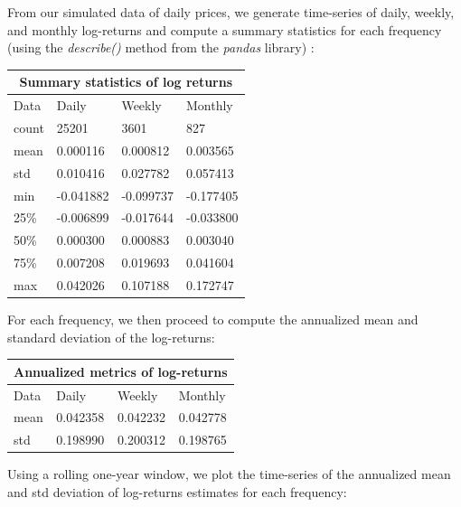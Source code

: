 \documentclass[10pt]{article}
\newenvironment{exercise}[2][Exercise]{\begin{trivlist}
  \item[\hskip \labelsep {\bfseries #1}\hskip \labelsep {\bfseries #2.}]}{\end{trivlist}}
\begin{document}
  \begin{exercise}{3}
 	 
	From our simulated data of daily prices, we generate time-series of daily, weekly, and monthly log-returns and compute a summary statistics for each frequency (using the \textit{describe()} method from the \textit{pandas} library) :
	
	\bigbreak
	
	\begin{tabular}{ |p{3cm}||p{3cm}|p{3cm}|p{3cm}|  }
 		\hline
		\multicolumn{4}{|c|}{Summary statistics of log returns} \\
		\hline
		Data & Daily & Weekly & Monthly\\
 		\hline
 		count   &  25201 & 3601 & 827\\
 		mean & 0.000116 & 0.000812 & 0.003565\\
 		std & 0.010416 & 0.027782 & 0.057413\\
 		min & -0.041882 & -0.099737 & -0.177405\\
 		25\% &  -0.006899 & -0.017644 & -0.033800\\
 		50\% & 0.000300 & 0.000883 & 0.003040\\
 		75\% & 0.007208 & 0.019693 & 0.041604\\
 		max & 0.042026 & 0.107188 & 0.172747\\
 		\hline
	\end{tabular}

	\bigbreak	
	
	For each frequency, we then proceed to compute the annualized mean and standard deviation of the log-returns: 
	
	\bigbreak
	
	\begin{tabular}{ |p{3cm}||p{3cm}|p{3cm}|p{3cm}|  }
		\hline
	 	\multicolumn{4}{|c|}{Annualized metrics of log-returns} \\
	 	\hline
	 	Data & Daily & Weekly & Monthly\\
 		\hline
 		mean  &  0.042358 & 0.042232 & 0.042778\\
 		std & 0.198990 & 0.200312 & 0.198765\\
 		\hline
	\end{tabular}
	
	\bigbreak	
	
	Using a rolling one-year window, we plot the time-series of the annualized mean and std deviation of log-returns estimates for each frequency:
	
	\begin{figure}[H]
	

\end{figure}
\end{exercise}
\end{document}
